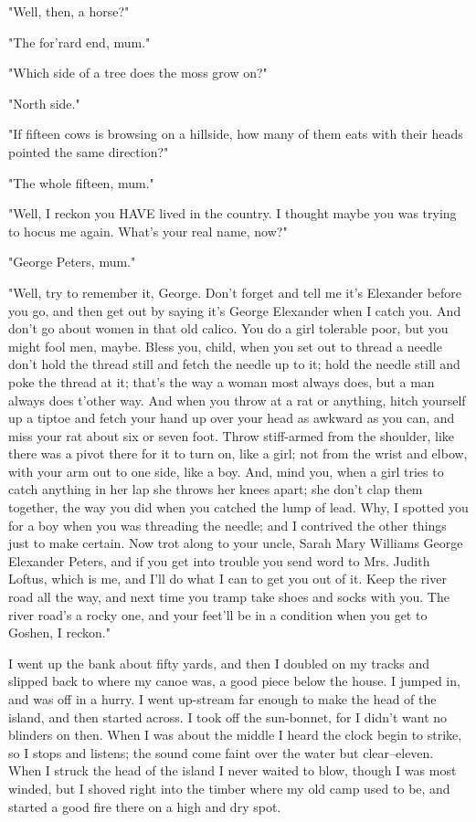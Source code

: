 "Well, then, a horse?"

"The for'rard end, mum."

"Which side of a tree does the moss grow on?"

"North side."

"If fifteen cows is browsing on a hillside, how many of them eats with
their heads pointed the same direction?"

"The whole fifteen, mum."

"Well, I reckon you HAVE lived in the country.  I thought maybe you was
trying to hocus me again.  What's your real name, now?"

"George Peters, mum."

"Well, try to remember it, George.  Don't forget and tell me it's
Elexander before you go, and then get out by saying it's George Elexander
when I catch you.  And don't go about women in that old calico.  You do a
girl tolerable poor, but you might fool men, maybe.  Bless you, child,
when you set out to thread a needle don't hold the thread still and fetch
the needle up to it; hold the needle still and poke the thread at it;
that's the way a woman most always does, but a man always does t'other
way.  And when you throw at a rat or anything, hitch yourself up a tiptoe
and fetch your hand up over your head as awkward as you can, and miss
your rat about six or seven foot. Throw stiff-armed from the shoulder,
like there was a pivot there for it to turn on, like a girl; not from the
wrist and elbow, with your arm out to one side, like a boy.  And, mind
you, when a girl tries to catch anything in her lap she throws her knees
apart; she don't clap them together, the way you did when you catched the
lump of lead.  Why, I spotted you for a boy when you was threading the
needle; and I contrived the other things just to make certain.  Now trot
along to your uncle, Sarah Mary Williams George Elexander Peters, and if
you get into trouble you send word to Mrs. Judith Loftus, which is me,
and I'll do what I can to get you out of it.  Keep the river road all the
way, and next time you tramp take shoes and socks with you. The river
road's a rocky one, and your feet'll be in a condition when you get to
Goshen, I reckon."

I went up the bank about fifty yards, and then I doubled on my tracks and
slipped back to where my canoe was, a good piece below the house.  I
jumped in, and was off in a hurry.  I went up-stream far enough to make
the head of the island, and then started across.  I took off the
sun-bonnet, for I didn't want no blinders on then.  When I was about the
middle I heard the clock begin to strike, so I stops and listens; the
sound come faint over the water but clear--eleven.  When I struck the
head of the island I never waited to blow, though I was most winded, but
I shoved right into the timber where my old camp used to be, and started
a good fire there on a high and dry spot.

